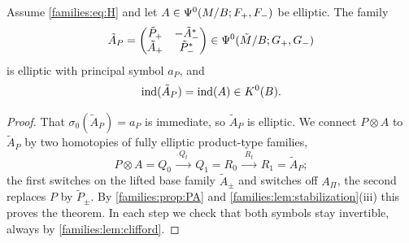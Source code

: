 \begin{theorem}[Multiplicativity]\label{families:thm:mult}
  Assume \eqref{families:eq:H} and let $A\in\Psi^{0}(M/B;F_+,F_-)$ be elliptic.
  The family
  \begin{equation*}
    \tilde A_P=\begin{pmatrix}\tilde P_+&-\tilde A_-^*\\
    \tilde A_+&\tilde P_-^*\end{pmatrix}\in\Psi^{0}(\tilde M/B;G_+,G_-)
  \end{equation*}
  is elliptic with principal symbol $a_P$, and
  \begin{equation*}
    \operatorname{ind}(\tilde A_P)=\operatorname{ind}(A)\in K^0(B).
  \end{equation*}
\end{theorem}
\begin{proof}
  That $\sigma_0(\tilde A_P)=a_P$ is immediate, so $\tilde A_P$ is elliptic.
  We connect $P\otimes A$ to $\tilde A_P$ by two homotopies of fully elliptic
  product-type families,
  \begin{equation*}
    P\otimes A=Q_0\ \xrightarrow{\ Q_t\ }\ Q_1=R_0\ \xrightarrow{\ R_t\ }\
    R_1=\tilde A_P;
  \end{equation*}
  the first switches on the lifted base family $\tilde A_\pm$ and switches off
  $A_\Pi$, the second replaces $P$ by $\tilde P_\pm$. By \cref{families:prop:PA}
  and \cref{families:lem:stabilization}(iii) this proves the theorem. In each
  step we check that both symbols stay invertible, always by
  \cref{families:lem:clifford}.


\end{proof}
